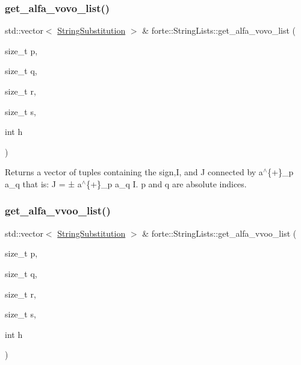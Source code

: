 \subsubsection{\texorpdfstring{get\+\_\+alfa\+\_\+vovo\+\_\+list()}{get\_alfa\_vovo\_list()}}
{\footnotesize\ttfamily std\+::vector$<$ \mbox{\hyperlink{structforte_1_1_string_substitution}{String\+Substitution}} $>$ \& forte\+::\+String\+Lists\+::get\+\_\+alfa\+\_\+vovo\+\_\+list (\begin{DoxyParamCaption}\item[{size\+\_\+t}]{p,  }\item[{size\+\_\+t}]{q,  }\item[{size\+\_\+t}]{r,  }\item[{size\+\_\+t}]{s,  }\item[{int}]{h }\end{DoxyParamCaption})}

Returns a vector of tuples containing the sign,I, and J connected by a$^\wedge$\{+\}\+\_\+p a\+\_\+q that is\+: J = ± a$^\wedge$\{+\}\+\_\+p a\+\_\+q I. p and q are absolute indices. \mbox{\label{classforte_1_1_string_lists_a73fa8f1b1ea45d6ec18486f50144849f}} 
\subsubsection{\texorpdfstring{get\+\_\+alfa\+\_\+vvoo\+\_\+list()}{get\_alfa\_vvoo\_list()}}
{\footnotesize\ttfamily std\+::vector$<$ \mbox{\hyperlink{structforte_1_1_string_substitution}{String\+Substitution}} $>$ \& forte\+::\+String\+Lists\+::get\+\_\+alfa\+\_\+vvoo\+\_\+list (\begin{DoxyParamCaption}\item[{size\+\_\+t}]{p,  }\item[{size\+\_\+t}]{q,  }\item[{size\+\_\+t}]{r,  }\item[{size\+\_\+t}]{s,  }\item[{int}]{h }\end{DoxyParamCaption})}

\mbox{\label{classforte_1_1_string_lists_a50ac4f357033b7f498dca10e6b21855e}} 
